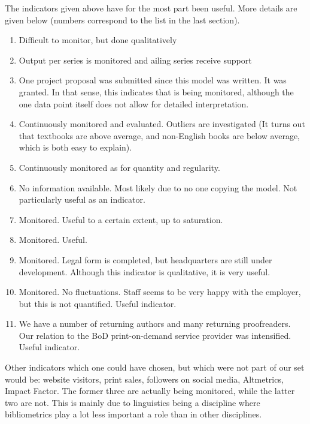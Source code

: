 \documentclass[nonflat,smallfont
]{langsci/langscibook}
\newcommand{\evaluation}[1]{
  \renewcommand{\tblslinecolour}{lsLightOrange}
  \tblssy{receipt}{Evaluation}{\vspace*{-5mm}#1}
}
\newcommand{\othersolutions}[1]{
  \renewcommand{\tblslinecolour}{lsDarkGreenOne}
  \tblssy{more}{Other solutions}{\vspace*{-5mm}#1}
}
\renewcommand{\tblssy}[4][black!12]{%
  \renewcommand{\langscisymbol}{#2}\renewcommand{\tblsboxcolor}{#1}
  \begin{mdframed}[style=yellowexercise,frametitle={#3}]
    #4
  \end{mdframed}
}
\begin{document}
\evaluation{
The indicators given above have for the most part been useful. More details are given below (numbers correspond to the list in the last section).
\begin{enumerate}
\item Difficult to monitor, but done qualitatively
\item Output per series is monitored and ailing series receive support
\item One project proposal was submitted since this model was written. It was granted. In that sense, this indicates that is being monitored, although the one data point itself does not allow for detailed interpretation. 
\item Continuously monitored and evaluated. Outliers are investigated (It turns out that textbooks are above average, and non-English books are below average, which is both easy to explain). 
\item Continuously monitored as for quantity and regularity. 
\item No information available. Most likely due to no one copying the model. Not particularly useful as an indicator.
\item Monitored. Useful to a certain extent, up to saturation. 
\item Monitored. Useful. 
\item Monitored. Legal form is completed, but headquarters are still under development. Although this indicator is qualitative, it is very useful. 
\item Monitored. No fluctuations. Staff seems to be very happy with the employer, but this is not quantified. Useful indicator. 
\item We have a number of returning authors and many returning proofreaders. Our relation to the BoD print-on-demand service provider was intensified. Useful indicator.
\end{enumerate}
}
\othersolutions{ 
Other indicators which one could have chosen, but which were not part of our set would be:
website visitors, print sales, followers on social media, Altmetrics, Impact Factor. The former three are actually being monitored, while the latter two are not. This is mainly due to linguistics being a discipline where bibliometrics play a lot less important a role than in other disciplines.
}

 
 
\end{document}
